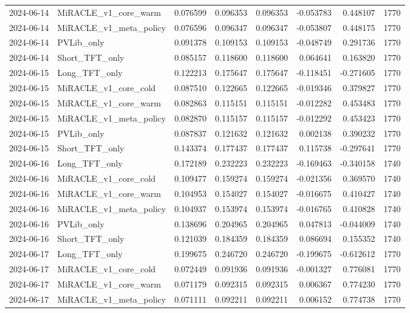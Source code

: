 \begin{tabular}{llrrrrrr}
2024-06-14 & MiRACLE_v1_core_warm & 0.076599 & 0.096353 & 0.096353 & -0.053783 & 0.448107 & 1770 \\
2024-06-14 & MiRACLE_v1_meta_policy & 0.076596 & 0.096347 & 0.096347 & -0.053807 & 0.448175 & 1770 \\
2024-06-14 & PVLib_only & 0.091378 & 0.109153 & 0.109153 & -0.048749 & 0.291736 & 1770 \\
2024-06-14 & Short_TFT_only & 0.085157 & 0.118600 & 0.118600 & 0.064641 & 0.163820 & 1770 \\
2024-06-15 & Long_TFT_only & 0.122213 & 0.175647 & 0.175647 & -0.118451 & -0.271605 & 1770 \\
2024-06-15 & MiRACLE_v1_core_cold & 0.087510 & 0.122665 & 0.122665 & -0.019346 & 0.379827 & 1770 \\
2024-06-15 & MiRACLE_v1_core_warm & 0.082863 & 0.115151 & 0.115151 & -0.012282 & 0.453483 & 1770 \\
2024-06-15 & MiRACLE_v1_meta_policy & 0.082870 & 0.115157 & 0.115157 & -0.012292 & 0.453423 & 1770 \\
2024-06-15 & PVLib_only & 0.087837 & 0.121632 & 0.121632 & 0.002138 & 0.390232 & 1770 \\
2024-06-15 & Short_TFT_only & 0.143374 & 0.177437 & 0.177437 & 0.115738 & -0.297641 & 1770 \\
2024-06-16 & Long_TFT_only & 0.172189 & 0.232223 & 0.232223 & -0.169463 & -0.340158 & 1740 \\
2024-06-16 & MiRACLE_v1_core_cold & 0.109477 & 0.159274 & 0.159274 & -0.021356 & 0.369570 & 1740 \\
2024-06-16 & MiRACLE_v1_core_warm & 0.104953 & 0.154027 & 0.154027 & -0.016675 & 0.410427 & 1740 \\
2024-06-16 & MiRACLE_v1_meta_policy & 0.104937 & 0.153974 & 0.153974 & -0.016765 & 0.410828 & 1740 \\
2024-06-16 & PVLib_only & 0.138696 & 0.204965 & 0.204965 & 0.047813 & -0.044009 & 1740 \\
2024-06-16 & Short_TFT_only & 0.121039 & 0.184359 & 0.184359 & 0.086694 & 0.155352 & 1740 \\
2024-06-17 & Long_TFT_only & 0.199675 & 0.246720 & 0.246720 & -0.199675 & -0.612612 & 1770 \\
2024-06-17 & MiRACLE_v1_core_cold & 0.072449 & 0.091936 & 0.091936 & -0.001327 & 0.776081 & 1770 \\
2024-06-17 & MiRACLE_v1_core_warm & 0.071179 & 0.092315 & 0.092315 & 0.006367 & 0.774230 & 1770 \\
2024-06-17 & MiRACLE_v1_meta_policy & 0.071111 & 0.092211 & 0.092211 & 0.006152 & 0.774738 & 1770 \\

\end{tabular}
